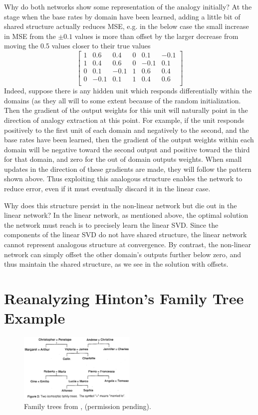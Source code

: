 \documentclass[10pt,letterpaper]{article}
\begin{document}
Why do both networks show some representation of the analogy initially? At the stage when the base rates by domain have been learned, adding a little bit of shared structure actually reduces MSE, e.g. in the below case the small increase in MSE from the \(\pm 0.1\) values is more than offset by the larger decrease from moving the 0.5 values closer to their true values 
\[ 
\left[ \begin{matrix} 
1 & 0.6 & 0.4 & 0 & 0.1 & -0.1 \\
1 & 0.4 & 0.6 & 0 & -0.1 & 0.1 \\
0 & 0.1 & -0.1 & 1 & 0.6 & 0.4  \\
0 & -0.1 & 0.1 & 1 & 0.4 & 0.6  \\
\end{matrix}  \right] 
\] 
Indeed, suppose there is any hidden unit which responds differentially within the domains (as they all will to some extent because of the random initialization. Then the gradient of the output weights for this unit will naturally point in the direction of analogy extraction at this point. For example, if the unit responds positively to the first unit of each domain and negatively to the second, and the base rates have been learned, then the gradient of the output weights within each domain will be negative toward the second output and positive toward the third for that domain, and zero for the out of domain outputs weights. When small updates in the direction of these gradients are made, they will follow the pattern shown above. Thus exploiting this analogous structure enables the network to reduce error, even if it must eventually discard it in the linear case.  \par
Why does this structure persist in the non-linear network but die out in the linear network? In the linear network, as mentioned above, the optimal solution the network must reach is to precisely learn the linear SVD. Since the components of the linear SVD do not have shared structure, the linear network cannot represent analogous structure at convergence. By contrast, the non-linear network can simply offset the other domain's outputs further below zero, and thus maintain the shared structure, as we see in the solution with offsets. 
\section{Reanalyzing Hinton's Family Tree Example}
\begin{figure}
\includegraphics[width=0.5\textwidth]{figures/hinton_family_tree_figure.png}
\caption{Family trees from \citet{Hinton1986}, (permission pending).}
\label{hinton_family_tree_figure}
\end{figure}
\end{document}
